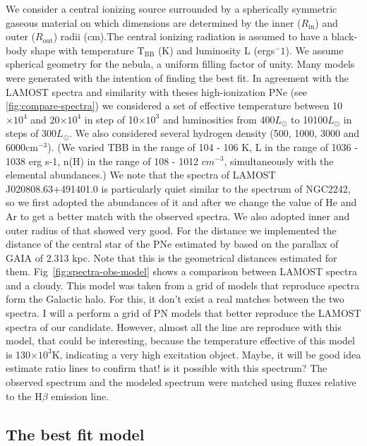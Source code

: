 \documentclass[fleqn,usenatbib]{mnras}
\begin{document}
{We consider a central ionizing source surrounded by a spherically symmetric
gaseous material on which dimensions are determined by the inner ($R_{\mathrm{in}}$) and
outer ($R_{\mathrm{out}}$) radii (cm).The central ionizing radiation is assumed to have a
black-body shape with temperature T$_{\mathrm{BB}}$ (K) and luminosity L
(ergs$^-1$). We assume spherical geometry for the nebula, a uniform filling factor of unity.
Many models were generated with the intention of finding the best fit.
In agreement with the LAMOST spectra and similarity with theses high-ionization PNe
(see \ref{fig:compare-spectra})
we considered a set of effective temperature between 10$\times10^4$ and 20$\times10^4$
in step of 10$\times10^3$ and luminosities from 400$L_{\odot}$ to 10100$L_{\odot}$ in steps
of 300$L_{\odot}$. We also considered several hydrogen density (500, 1000, 3000 and 6000cm$^{-3}$).
(We varied TBB in the
range of 104 - 106 K, L in the range of 1036 - 1038 erg s-1, n(H)
in the range of 108 - 1012 $cm^{-3}$, simultaneously with the elemental abundances.)
We note that the spectra of LAMOST J020808.63+491401.0 is particularly quiet similar to the
spectrum of NGC2242, so we first adopted the abundances of it and after we change the
value of He and Ar to get a better match with the observed spectra. We also adopted inner
and outer radius
of that showed very good. For the distance we implemented the distance of the central star
of the PNe estimated by \citet{Bailer:2021} based on
the parallax of GAIA of 2.313 kpc. Note that this is the geometrical distances estimated for them. 
Fig~\ref{fig:spectra-obs-model} shows a comparison
between LAMOST spectra and a {\sc cloudy}. This model was taken from a grid of
models that reproduce spectra form the Galactic halo. For this, it don't exist a real matches between the two spectra.
I will a perform a grid of PN models that better reproduce the LAMOST spectra of our candidate.
However, almost all the line are reproduce with this model, that could be interesting, because the
temperature effective of this model is 130$\times10^3$K, indicating a very high excitation object.
Maybe, it will be good idea estimate ratio lines to confirm that! is it possible with this spectrum?
The observed spectrum and the modeled spectrum were
matched using fluxes relative to the H{$\beta$} emission line.

\subsection{The best fit model}
\label{sec:best-fit}

}
\end{document}
